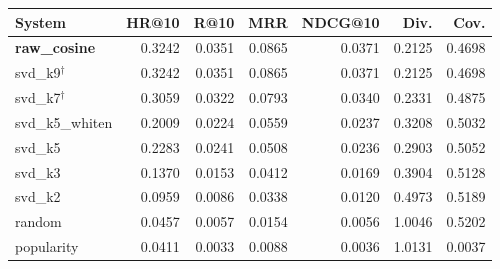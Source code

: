 \begin{tabular}{lrrrrrr}
\toprule
System & HR@10 & R@10 & MRR & NDCG@10 & Div. & Cov. \\
\midrule
\textbf{raw\_cosine} & 0.3242 & 0.0351 & 0.0865 & 0.0371 & 0.2125 & 0.4698 \\
svd\_k9$^{\dagger}$ & 0.3242 & 0.0351 & 0.0865 & 0.0371 & 0.2125 & 0.4698 \\
svd\_k7$^{\dagger}$ & 0.3059 & 0.0322 & 0.0793 & 0.0340 & 0.2331 & 0.4875 \\
svd\_k5\_whiten & 0.2009 & 0.0224 & 0.0559 & 0.0237 & 0.3208 & 0.5032 \\
svd\_k5 & 0.2283 & 0.0241 & 0.0508 & 0.0236 & 0.2903 & 0.5052 \\
svd\_k3 & 0.1370 & 0.0153 & 0.0412 & 0.0169 & 0.3904 & 0.5128 \\
svd\_k2 & 0.0959 & 0.0086 & 0.0338 & 0.0120 & 0.4973 & 0.5189 \\
random & 0.0457 & 0.0057 & 0.0154 & 0.0056 & 1.0046 & 0.5202 \\
popularity & 0.0411 & 0.0033 & 0.0088 & 0.0036 & 1.0131 & 0.0037 \\
\bottomrule
\end{tabular}